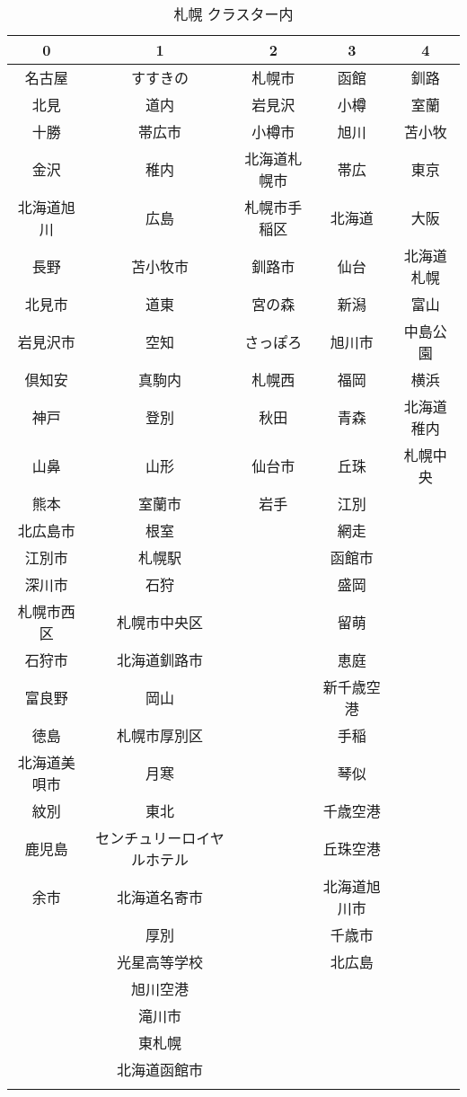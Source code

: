 \begin{table}[h]
  \center
  \caption{札幌 クラスター内}
  \label{s_100_5}
  \begin{tabular}{|c|c|c|c|c|} \hline
    0 & 1 & 2 & 3 & 4 \\ \hline \hline
    名古屋 & すすきの & 札幌市 & 函館 & 釧路 \\
    北見 & 道内 & 岩見沢 & 小樽 & 室蘭 \\
    十勝 & 帯広市 & 小樽市 & 旭川 & 苫小牧 \\
    金沢 & 稚内 & 北海道札幌市 & 帯広 & 東京 \\
    北海道旭川 & 広島 & 札幌市手稲区 & 北海道 & 大阪 \\ \hline
    長野 & 苫小牧市 & 釧路市 & 仙台 & 北海道札幌 \\
    北見市 & 道東 & 宮の森 & 新潟 & 富山 \\
    岩見沢市 & 空知 & さっぽろ & 旭川市 & 中島公園 \\
    倶知安 & 真駒内 & 札幌西 & 福岡 & 横浜 \\
    神戸 & 登別 & 秋田 & 青森 & 北海道稚内 \\ \hline
    山鼻 & 山形 & 仙台市 & 丘珠 & 札幌中央 \\
    熊本 & 室蘭市 & 岩手 & 江別 &  \\
    北広島市 & 根室 &  & 網走 &  \\
    江別市 & 札幌駅 &  & 函館市 &  \\
    深川市 & 石狩 &  & 盛岡 &  \\ \hline
    札幌市西区 & 札幌市中央区 &  & 留萌 &  \\
    石狩市 & 北海道釧路市 &  & 恵庭 &  \\
    富良野 & 岡山 &  & 新千歳空港 &  \\
    徳島 & 札幌市厚別区 &  & 手稲 &  \\
    北海道美唄市 & 月寒 &  & 琴似 &  \\ \hline
    紋別 & 東北 &  & 千歳空港 &  \\
    鹿児島 & センチュリーロイヤルホテル &  & 丘珠空港 &  \\
    余市 & 北海道名寄市 &  & 北海道旭川市 &  \\
     & 厚別 &  & 千歳市 &  \\
     & 光星高等学校 &  & 北広島 &  \\ \hline
     & 旭川空港 &  &  &  \\
     & 滝川市 &  &  &  \\
     & 東札幌 &  &  &  \\
     & 北海道函館市 &  &  &  \\
     &  &  &  &  \\ \hline
  \end{tabular}
\end{table}
